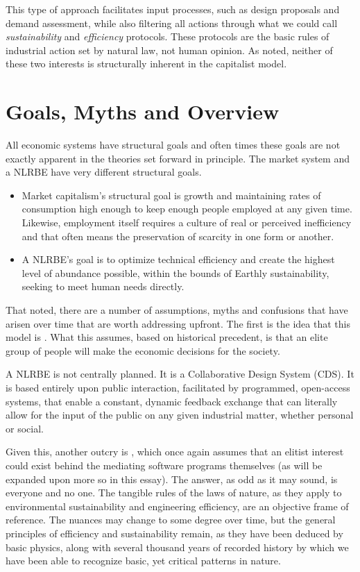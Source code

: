 \documentclass[10pt, a4paper, cleardoubleempty, openright, twoside]{book}
\begin{document}
This type of approach facilitates input processes, such as design
proposals and demand assessment, while also filtering all actions
through what we could call \emph{sustainability} and \emph{efficiency}
protocols. These protocols are the basic rules of industrial action set
by natural law, not human opinion. As noted, neither of these two
interests is structurally inherent in the capitalist model. 

\section {Goals, Myths and Overview}

All economic systems have structural goals and often times these goals
are not exactly apparent in the theories set forward in principle. The
market system and a NLRBE have very different structural goals. 

\begin{itemize}
  \item
	Market capitalism's structural goal is growth and maintaining rates of
	consumption high enough to keep enough people employed at any given
	time. Likewise, employment itself requires a culture of real or
	perceived inefficiency and that often means the preservation of
	scarcity in one form or another. 

  \item
	A NLRBE's goal is to optimize technical efficiency and create the
	highest level of abundance possible, within the bounds of Earthly
	sustainability, seeking to meet human needs directly.
\end{itemize}

That noted, there are a number of assumptions, myths and confusions that
have arisen over time that are worth addressing upfront. The first is
the idea that this model is . What this
assumes, based on historical precedent, is that an elite group of people
will make the economic decisions for the society.

A NLRBE is not centrally planned. It is a Collaborative Design System
(CDS). It is based entirely upon public interaction, facilitated by
programmed, open-access systems, that enable a constant, dynamic
feedback exchange that can literally allow for the input of the public
on any given industrial matter, whether personal or social.

Given this, another outcry is ,
which once again assumes that an elitist interest could exist behind the
mediating software programs themselves (as will be expanded upon more so
in this essay). The answer, as odd as it may sound, is everyone and no
one. The tangible rules of the laws of nature, as they apply to
environmental sustainability and engineering efficiency, are an
objective frame of reference. The nuances may change to some degree over
time, but the general principles of efficiency and sustainability
remain, as they have been deduced by basic physics, along with several
thousand years of recorded history by which we have been able to
recognize basic, yet critical patterns in nature.
\end{document}
